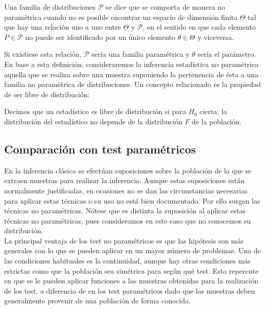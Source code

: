 \begin{definicion}
	Una familia de distribuciones $\mathcal{P}$ se dice que 
se comporta de manera no paramétrica cuando no es posible
encontrar un espacio de dimensión finita $\Theta$ tal que hay 
una relación uno a uno entre $\Theta$ y $\mathcal{P}$, en el 
sentido en que cada elemento $P \in \mathcal{P}$ no puede ser 
identificado por un único elemento $\theta \in \Theta$ y 
viceversa.
\end{definicion}

	Si existiese esta relación, $\mathcal{P}$ sería una 
familia paramétrica y $\theta$ sería el parámetro.\\
	En base a esta definición, consideraremos la inferencia 
estadística no paramétrica aquella que se realiza sobre una 
muestra suponiendo la pertenencia de ésta a una familia no 
paramétrica de distribuciones. Un concepto relacionado es la 
propiedad de ser libre de distribución:
	
\begin{definicion}
	Decimos que un estadístico es libre de distribución si 
para $H_0$ cierta, la distribución del estadístico no depende 
de la distribución $F$ de la población.
\end{definicion}
	
	\subsection{Comparación con test paramétricos}
	
	En la inferencia clásica se efectúan suposiciones sobre 
la población de la que se extraen muestras para realizar la 
inferencia. Aunque estas suposiciones están normalmente 
justificadas, en ocasiones no se dan las circunstancias 
necesarias para aplicar estas técnicas o su uso no está bien 
documentado. Por ello surgen las técnicas no paramétricas. 
Nótese que es distinta la suposición al aplicar estas 
técnicas no paramétricas, pues consideramos en este caso que 
no conocemos su distribución.\\
	
 	La principal ventaja de los test no paramétricos es que  
las hipótesis son más generales con lo que se pueden aplicar 
en un mayor número de problemas. Una de las condiciones 
habituales es la continuidad, aunque hay otras condiciones 
más estrictas como que la población sea simétrica para según 
qué test. Esto repercute en que se le pueden aplicar 
funciones a las muestras obtenidas para la realización de los 
test, a diferencia de en los test paramétricos dado que las 
muestras deben generalmente provenir de una población de 
forma conocida.\\
 	
